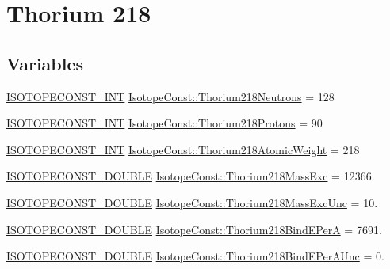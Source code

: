 \hypertarget{group___isotope_const-_thorium-_th218}{}\section{Thorium 218}
\label{group___isotope_const-_thorium-_th218}
\subsection*{Variables}
\begin{DoxyCompactItemize}
\item 
\mbox{\hyperlink{group___isotope_const-_macros_ga5f18360b3e99483a35c32d789e62621c}{I\+S\+O\+T\+O\+P\+E\+C\+O\+N\+S\+T\+\_\+\+I\+NT}} \mbox{\hyperlink{group___isotope_const-_thorium-_th218_ga437e04777fc24cfa75811abbea101260}{Isotope\+Const\+::\+Thorium218\+Neutrons}} = 128
\item 
\mbox{\hyperlink{group___isotope_const-_macros_ga5f18360b3e99483a35c32d789e62621c}{I\+S\+O\+T\+O\+P\+E\+C\+O\+N\+S\+T\+\_\+\+I\+NT}} \mbox{\hyperlink{group___isotope_const-_thorium-_th218_ga10d450494f0e4346b8464b5f9ae7c73a}{Isotope\+Const\+::\+Thorium218\+Protons}} = 90
\item 
\mbox{\hyperlink{group___isotope_const-_macros_ga5f18360b3e99483a35c32d789e62621c}{I\+S\+O\+T\+O\+P\+E\+C\+O\+N\+S\+T\+\_\+\+I\+NT}} \mbox{\hyperlink{group___isotope_const-_thorium-_th218_ga8f67bf11ef971834adaee59917e6c6c0}{Isotope\+Const\+::\+Thorium218\+Atomic\+Weight}} = 218
\item 
\mbox{\hyperlink{group___isotope_const-_macros_ga8f45a7272ce02c0b4c65c44636ed719a}{I\+S\+O\+T\+O\+P\+E\+C\+O\+N\+S\+T\+\_\+\+D\+O\+U\+B\+LE}} \mbox{\hyperlink{group___isotope_const-_thorium-_th218_ga3bbb7e2c4d6d2ba82b75bd7073afa268}{Isotope\+Const\+::\+Thorium218\+Mass\+Exc}} = 12366.
\item 
\mbox{\hyperlink{group___isotope_const-_macros_ga8f45a7272ce02c0b4c65c44636ed719a}{I\+S\+O\+T\+O\+P\+E\+C\+O\+N\+S\+T\+\_\+\+D\+O\+U\+B\+LE}} \mbox{\hyperlink{group___isotope_const-_thorium-_th218_ga0ce24c9a8fd54614861563166bd32e69}{Isotope\+Const\+::\+Thorium218\+Mass\+Exc\+Unc}} = 10.
\item 
\mbox{\hyperlink{group___isotope_const-_macros_ga8f45a7272ce02c0b4c65c44636ed719a}{I\+S\+O\+T\+O\+P\+E\+C\+O\+N\+S\+T\+\_\+\+D\+O\+U\+B\+LE}} \mbox{\hyperlink{group___isotope_const-_thorium-_th218_gab1887c49fa7e4313f03b127662b71908}{Isotope\+Const\+::\+Thorium218\+Bind\+E\+PerA}} = 7691.
\item 
\mbox{\hyperlink{group___isotope_const-_macros_ga8f45a7272ce02c0b4c65c44636ed719a}{I\+S\+O\+T\+O\+P\+E\+C\+O\+N\+S\+T\+\_\+\+D\+O\+U\+B\+LE}} \mbox{\hyperlink{group___isotope_const-_thorium-_th218_ga5a6bb7e76872ed716bef12de17aec7cf}{Isotope\+Const\+::\+Thorium218\+Bind\+E\+Per\+A\+Unc}} = 0.

\end{DoxyCompactItemize}
